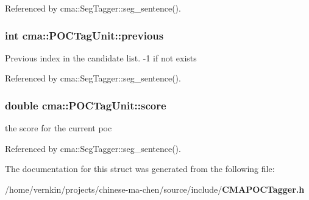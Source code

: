 Referenced by cma::SegTagger::seg\_\-sentence().
\subsubsection[{previous}]{\setlength{\rightskip}{0pt plus 5cm}int {\bf cma::POCTagUnit::previous}}\label{structcma_1_1POCTagUnit_a65a1e27d97dfa822fee58fbe3dc2a2a3}
Previous index in the candidate list. -\/1 if not exists 

Referenced by cma::SegTagger::seg\_\-sentence().
\subsubsection[{score}]{\setlength{\rightskip}{0pt plus 5cm}double {\bf cma::POCTagUnit::score}}\label{structcma_1_1POCTagUnit_adee6f742a3e599ee2093d224d447832f}
the score for the current poc 

Referenced by cma::SegTagger::seg\_\-sentence().

The documentation for this struct was generated from the following file:\begin{DoxyCompactItemize}
\item 
/home/vernkin/projects/chinese-\/ma-\/chen/source/include/{\bf CMAPOCTagger.h}\end{DoxyCompactItemize}
